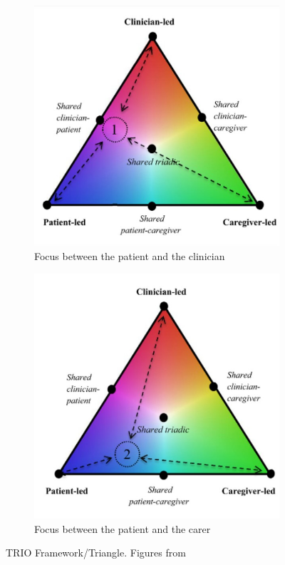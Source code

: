 \documentclass{sigchi}
\begin{document}
\begin{figure} [H]
\begin{subfigure}{.45\columnwidth}
  \centering
  \includegraphics[width=1\columnwidth]{figures/Triangle1Screenshot.jpg}
  \caption{Focus between the patient and the clinician}
  \label{a:PatientClinician}
\end{subfigure}%
\hfill
\begin{subfigure}{.45\columnwidth}
  \centering
  \includegraphics[width=1\columnwidth]{figures/Triangle2Screenshotjpg.jpg}
  \caption{Focus between the patient and the carer}
  \label{b:PatientCarer}
\end{subfigure}
\caption{TRIO Framework/Triangle. Figures from}
\label{fig:TRIO Framework/Triangle}
\end{figure}
\end{document}
